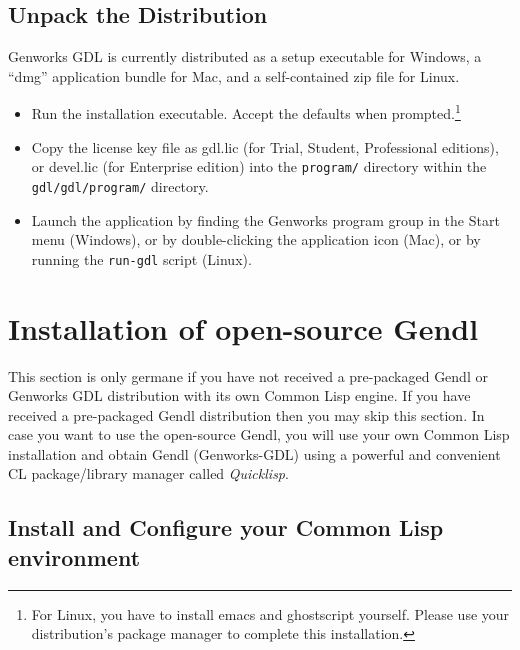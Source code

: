 \documentclass [11pt]{book}
\begin{document}
\subsection{Unpack the Distribution}

\label{subsec:unpackthedistribution}

Genworks GDL is currently distributed as a setup executable for Windows,
a ``dmg'' application bundle for Mac, and a self-contained zip file for Linux.

\begin{itemize}

\item Run the installation executable. Accept the defaults when prompted.\footnote{For Linux, you have to install emacs and ghostscript yourself. Please use your distribution's package manager to complete this installation.}

\item Copy the license key file as gdl.lic (for Trial,
	 Student, Professional editions), or devel.lic (for Enterprise edition) into the \texttt{program/} directory within the \texttt{gdl/gdl/program/} directory.

\item Launch the application by finding the Genworks program group in the Start menu (Windows), or by double-clicking the application icon (Mac), or by running the \texttt{run-gdl} script (Linux).

\end{itemize}



\section{Installation of open-source Gendl}

\label{sec:installationofopen-sourcegendl}

This section is only germane if you have not received a
pre-packaged Gendl or Genworks GDL distribution with its own Common
Lisp engine.  If you have received a pre-packaged Gendl distribution
then you may skip this section. In case you want to use the
open-source Gendl, you will use your own Common Lisp installation and
obtain Gendl (Genworks-GDL) using a powerful and convenient CL
package/library manager called \emph{Quicklisp}.

\subsection{Install and Configure your Common Lisp environment}
\end{document}

